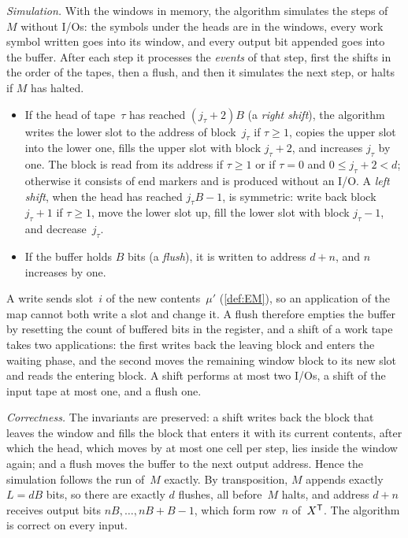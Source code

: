 \begin{outline}
\emph{Simulation.} With the windows in memory, the algorithm simulates the steps of~$M$ without I/Os: the symbols under
the heads are in the windows, every work symbol written goes into its window, and every output bit appended goes into the
buffer. After each step it processes the \emph{events} of that step, first the shifts in the order of the tapes, then a
flush, and then it simulates the next step, or halts if $M$ has halted.
\begin{itemize}
\item If the head of tape~$\tau$ has reached $(j_\tau+2)B$ (a \emph{right shift}), the algorithm writes the lower slot to
the address of block~$j_\tau$ if $\tau\ge1$, copies the upper slot into the lower one, fills the upper slot with block
$j_\tau+2$, and increases $j_\tau$ by one. The block is read from its address if $\tau\ge1$ or if $\tau=0$ and
$0\le j_\tau+2<d$; otherwise it consists of end markers and is produced without an I/O. A \emph{left shift}, when the head
has reached $j_\tau B-1$, is symmetric: write back block $j_\tau+1$ if $\tau\ge1$, move the lower slot up, fill the lower
slot with block $j_\tau-1$, and decrease~$j_\tau$.
\item If the buffer holds $B$ bits (a \emph{flush}), it is written to address $d+n$, and $n$ increases by one.
\end{itemize}
A write sends slot~$i$ of the new contents~$\mu'$ (\cref{def:EM}), so an application of the map cannot both write a slot
and change it. A flush therefore empties the buffer by resetting the count of buffered bits in the register, and a shift
of a work tape takes two applications: the first writes back the leaving block and enters the waiting phase, and the
second moves the remaining window block to its new slot and reads the entering block. A shift performs at most two I/Os,
a shift of the input tape at most one, and a flush one.

\emph{Correctness.} The invariants are preserved: a shift writes back the block that leaves the window and fills the
block that enters it with its current contents, after which the head, which moves by at most one cell per step, lies
inside the window again; and a flush moves the buffer to the next output address. Hence the simulation follows the run
of~$M$ exactly. By transposition, $M$ appends exactly $L=dB$ bits, so there are exactly $d$ flushes, all before~$M$ halts,
and address $d+n$ receives output bits $nB,\dots,nB+B-1$, which form row~$n$ of~$X^{\mathsf{T}}$. The algorithm is correct on every
input.


\end{outline}
